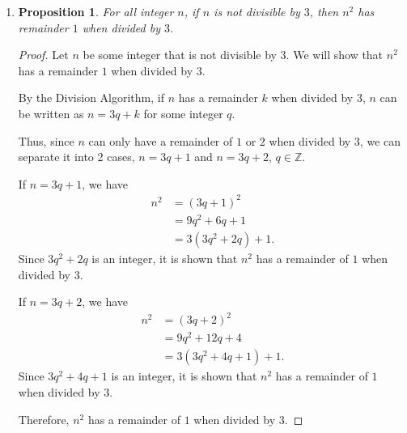 \documentclass{article}
\newtheorem{prop}[thm]{Proposition}
\begin{document}
\begin{enumerate}
\item 
\begin{prop}
  For all integer $n$,  if $n$ is not divisible by $3$, then $n^2$ has remainder $1$ when divided by $3$.
\end{prop} 
\begin{proof}
    Let $n$ be some integer that is not divisible by $3$. We will show that $n^2$ has a remainder $1$ when divided by $3$. 
    
    By the Division Algorithm, if $n$ has a remainder $k$ when divided by $3$, $n$ can be written as $n = 3q + k$ for some integer $q$.

    Thus, since $n$ can only have a remainder of $1$ or $2$ when divided by $3$, we can separate it into 2 cases, $n = 3q + 1$ and $n = 3q + 2$, $q \in \mathbb{Z}$.

    If $n = 3q + 1$, we have
    \begin{align}
        n^2 &= (3q + 1)^2 \\
            &= 9q^2 + 6q + 1 \\
            &= 3(3q^2 + 2q) + 1.
    \end{align}
    Since $3q^2 + 2q$ is an integer, it is shown that $n^2$ has a remainder of $1$ when divided by $3$.

    If $n = 3q + 2$, we have
    \begin{align}
        n^2 &= (3q + 2)^2 \\
            &= 9q^2 + 12q + 4 \\
            &= 3(3q^2 + 4q + 1) + 1.
    \end{align}
    Since $3q^2 + 4q + 1$ is an integer, it is shown that $n^2$ has a remainder of $1$ when divided by $3$.

    Therefore, $n^2$ has a remainder of $1$ when divided by $3$.
\end{proof}
    
\end{enumerate}
\end{document}
